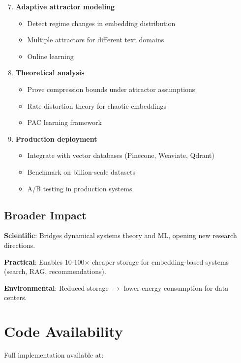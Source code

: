 \documentclass[11pt,a4paper]{article}
\begin{document}
\begin{enumerate}
\setcounter{enumi}{6}
\item \textbf{Adaptive attractor modeling}
   \begin{itemize}
   \item Detect regime changes in embedding distribution
   \item Multiple attractors for different text domains
   \item Online learning
   \end{itemize}

\item \textbf{Theoretical analysis}
   \begin{itemize}
   \item Prove compression bounds under attractor assumptions
   \item Rate-distortion theory for chaotic embeddings
   \item PAC learning framework
   \end{itemize}

\item \textbf{Production deployment}
   \begin{itemize}
   \item Integrate with vector databases (Pinecone, Weaviate, Qdrant)
   \item Benchmark on billion-scale datasets
   \item A/B testing in production systems
   \end{itemize}
\end{enumerate}

\subsection{Broader Impact}

\textbf{Scientific}: Bridges dynamical systems theory and ML, opening new research directions.

\textbf{Practical}: Enables 10-100$\times$ cheaper storage for embedding-based systems (search, RAG, recommendations).

\textbf{Environmental}: Reduced storage $\to$ lower energy consumption for data centers.

\section{Code Availability}

Full implementation available at:
\end{document}
